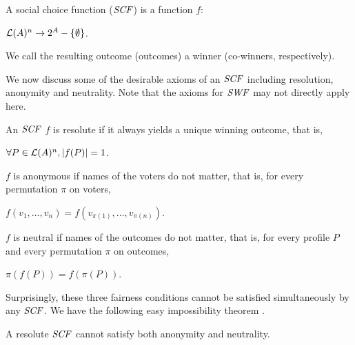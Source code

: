 \begin{definition}
	A social choice function ($\it{SCF}$) is a function $f$:
	\begin{center}
		$\mathcal{L}(A)^n \rightarrow 2^A-\{\emptyset\}$.
	\end{center}
	We call the resulting outcome (outcomes)
	a winner (co-winners, respectively).
\end{definition}

We now discuss some of the desirable axioms of an $\it{SCF}$ including
resolution, anonymity and neutrality.
Note that the axioms for $\it{SWF}$ may not directly apply here.

\begin{definition}
	An $\it{SCF}$ $f$ is resolute if it always yields a unique winning outcome, that is,
	\begin{center}
		$\forall P \in \mathcal{L}(A)^n, |f(P)|=1$.
	\end{center}
	$f$ is anonymous if names of the voters do not matter, that is,
	for every permutation $\pi$ on voters,
	\begin{center}
		$f({v_1,\ldots,v_n}) = f(v_{\pi(1)},\ldots,v_{\pi(n)})$.
	\end{center}
	$f$ is neutral if names of the outcomes do not matter, that is,
	for every profile $P$ and every permutation $\pi$ on outcomes,
	\begin{center}
		$\pi(f(P)) = f(\pi(P))$.
	\end{center}
\end{definition}

Surprisingly, these three fairness conditions cannot be satisfied simultaneously
by any $\it{SCF}$. We have the following easy impossibility theorem \cite{Brandt:COMSOC}.

\begin{thm}
\label{thm:easy}
	A resolute $\it{SCF}$ cannot satisfy both anonymity and neutrality.
\end{thm}
%


